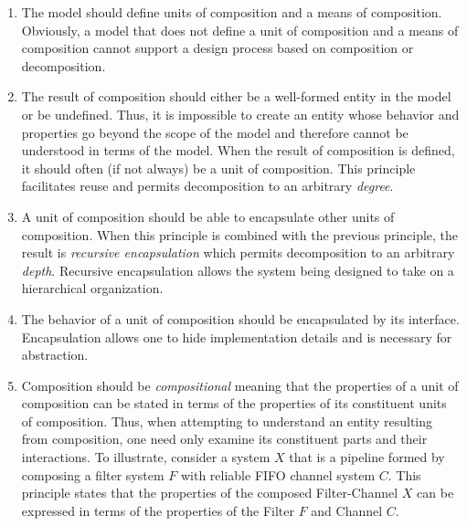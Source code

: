 \begin{enumerate}
\item The model should define units of composition and a means of composition.
Obviously, a model that does not define a unit of composition and a means of composition cannot support a design process based on composition or decomposition.

\item The result of composition should either be a well-formed entity in the model or be undefined.
Thus, it is impossible to create an entity whose behavior and properties go beyond the scope of the model and therefore cannot be understood in terms of the model.
When the result of composition is defined, it should often (if not always) be a unit of composition.
This principle facilitates reuse and permits decomposition to an arbitrary \emph{degree}.

\item A unit of composition should be able to encapsulate other units of composition.
When this principle is combined with the previous principle, the result is \emph{recursive encapsulation} which permits decomposition to an arbitrary \emph{depth}.
Recursive encapsulation allows the system being designed to take on a hierarchical organization.

\item The behavior of a unit of composition should be encapsulated by its interface.
Encapsulation allows one to hide implementation details and is necessary for abstraction.


\item Composition should be \emph{compositional} meaning that the properties of a unit of composition can be stated in terms of the properties of its constituent units of composition.
Thus, when attempting to understand an entity resulting from composition, one need only examine its constituent parts and their interactions.
To illustrate, consider a system $X$ that is a pipeline formed by composing a filter system $F$ with reliable FIFO channel system $C$.
This principle states that the properties of the composed Filter-Channel $X$ can be expressed in terms of the properties of the Filter $F$ and Channel $C$.


\end{enumerate}

